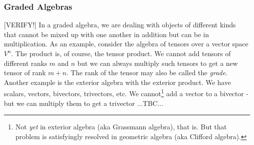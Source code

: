 














\subsubsection{Graded Algebras} [VERIFY!]
In a graded algebra, we are dealing with objects of different kinds that cannot be mixed up with one another in addition but can be in multiplication. As an example, consider the algebra of tensors over a vector space $V^n$. The product is, of course, the tensor product. We cannot add tensors of different ranks $m$ and $n$ but we can always multiply such tensors to get a new tensor of rank $m+n$. The rank of the tensor may also be called the \emph{grade}. Another example is the exterior algebra with the exterior product. We have scalars, vectors, bivectors, trivectors, etc. We cannot\footnote{Not \emph{yet} in exterior algebra (aka Grassmann algebra), that is. But that problem is satisfyingly resolved in geometric algebra (aka Clifford algebra).} add a vector to a bivector - but we can multiply them to get a trivector ...TBC...

